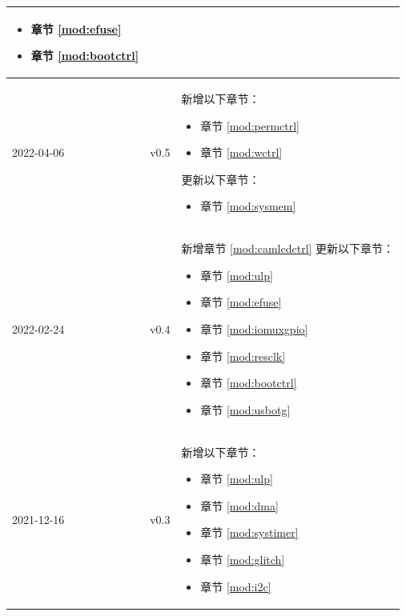 \begin{longtable}[l]{ | m{2cm} | m{1.5cm} | m{12cm} | }
\begin{itemize}
        \item 章节 \ref{mod:efuse} \textit{\nameref{mod:efuse}} %
        \item 章节 \ref{mod:bootctrl} \textit{\nameref{mod:bootctrl}}
    \end{itemize}
    \\\hline
    2022-04-06     & v0.5  &
    新增以下章节：
    \begin{itemize}
        \item 章节 \ref{mod:permctrl} \textit{\nameref{mod:permctrl}}
        \item 章节 \ref{mod:wctrl} \textit{\nameref{mod:wctrl}}
    \end{itemize}
    更新以下章节：
    \begin{itemize}
        \item 章节 \ref{mod:sysmem} \textit{\nameref{mod:sysmem}}
    \end{itemize}
    \\\hline
    2022-02-24     & v0.4  &
    新增章节 \ref{mod:camlcdctrl} \textit{\nameref{mod:camlcdctrl}}
    更新以下章节：
    \begin{itemize}
        \item 章节 \ref{mod:ulp} \textit{\nameref{mod:ulp}} %
        \item 章节 \ref{mod:efuse} \textit{\nameref{mod:efuse}}
        \item 章节 \ref{mod:iomuxgpio} \textit{\nameref{mod:iomuxgpio}} %
        \item 章节 \ref{mod:resclk} \textit{\nameref{mod:resclk}}
        \item 章节 \ref{mod:bootctrl} \textit{\nameref{mod:bootctrl}} %
        \item 章节 \ref{mod:usbotg} \textit{\nameref{mod:usbotg}}
    \end{itemize}
    \\\hline
    2021-12-16 & v0.3 &
    新增以下章节：
        \begin{itemize}
            \item 章节 \ref{mod:ulp} \textit{\nameref{mod:ulp}}
            \item 章节 \ref{mod:dma} \textit{\nameref{mod:dma}}
            \item 章节 \ref{mod:systimer} \textit{\nameref{mod:systimer}}
            \item 章节 \ref{mod:glitch} \textit{\nameref{mod:glitch}}
            \item 章节 \ref{mod:i2c} \textit{\nameref{mod:i2c}}

\end{itemize}
\end{longtable}
